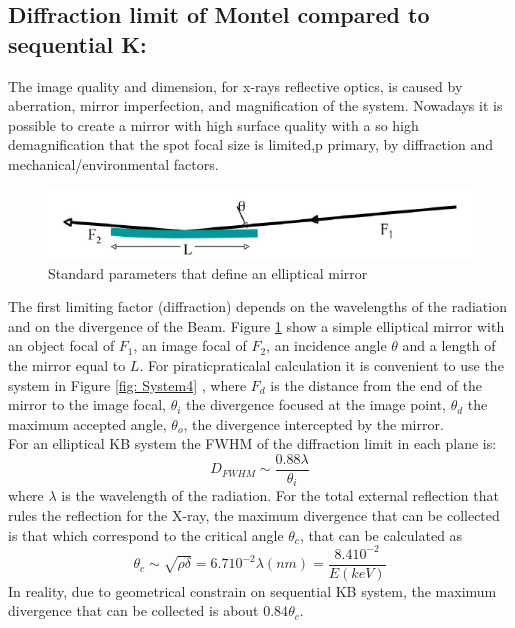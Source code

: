 \subsection{Diffraction limit of Montel compared to sequential K:}
The image quality and dimension, for x-rays reflective optics, is  caused by aberration, mirror imperfection, and magnification of the system. Nowadays it is possible to create a mirror with high surface quality with a so high demagnification that the spot focal size is limited,p primary, by diffraction and mechanical/environmental factors.
\begin{figure}[H]
%
\centering
%
\includegraphics[width=.7\textwidth]{Immagini/Chapter2/System3}
%
\caption{Standard parameters that define an elliptical mirror}
%
\label{fig: System3}
%
\end{figure}
The first limiting factor (diffraction) depends on the wavelengths of the radiation and on the divergence of the Beam. Figure \ref{fig: System3} show a simple elliptical mirror with an object focal of $F_1 $, an image focal of $F_2 $, an incidence angle $\theta $ and a length of the mirror equal to $L $. For piraticpraticalal calculation it is convenient to use the system in Figure \ref{fig: System4} , where $F_d $ is the distance from the end of the mirror to the image focal, $\theta_i $ the divergence focused at the image point, $\theta_d $ the maximum accepted angle, $\theta_o $, the divergence intercepted by the mirror.
\\
For an elliptical KB system the FWHM of the diffraction limit in each plane is:
\begin{equation}
D_{FWHM} \sim  \frac{0.88 \lambda}{\theta_i}
\label{eq: D_FWHM}
\end{equation}
\noindent where $\lambda $ is the wavelength of the radiation. For the total external reflection that rules the reflection for the X-ray, the maximum divergence that can be collected is that which correspond to the critical angle $\theta_c $, that can be calculated as
\begin{equation}
\theta_c \sim \sqrt{\rho \delta} = 6.7 10^{-2} \lambda (nm) = \frac{8.4 10^{-2}}{E(keV)}
\label{eq: theta_c}
\end{equation}
\noindent In reality, due to geometrical constrain on sequential KB system, the maximum divergence that can be collected is about $0.84 \theta_c $.
